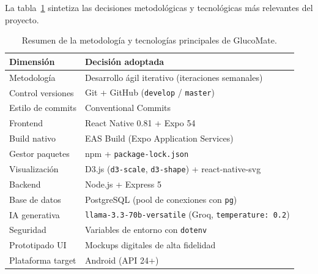 La tabla~\ref{tab:resumen-metodologia} sintetiza las decisiones metodológicas y
tecnológicas más relevantes del proyecto.

\begin{table}[H]
\centering
\caption{Resumen de la metodología y tecnologías principales de GlucoMate.}
\label{tab:resumen-metodologia}
\begin{tabular}{|l|l|}
\hline
\textbf{Dimensión} & \textbf{Decisión adoptada} \\
\hline
Metodología       & Desarrollo ágil iterativo (iteraciones semanales) \\
Control versiones & Git + GitHub (\texttt{develop} / \texttt{master}) \\
Estilo de commits & Conventional Commits \\
Frontend          & React Native 0.81 + Expo 54 \\
Build nativo      & EAS Build (Expo Application Services) \\
Gestor paquetes   & npm + \texttt{package-lock.json} \\
Visualización     & D3.js (\texttt{d3-scale}, \texttt{d3-shape}) + react-native-svg \\
Backend           & Node.js + Express 5 \\
Base de datos     & PostgreSQL (pool de conexiones con \texttt{pg}) \\
IA generativa     & \texttt{llama-3.3-70b-versatile} (Groq, \texttt{temperature: 0.2}) \\
Seguridad         & Variables de entorno con \texttt{dotenv} \\
Prototipado UI    & Mockups digitales de alta fidelidad \\
Plataforma target & Android (API 24+) \\
\hline
\end{tabular}
\end{table}
